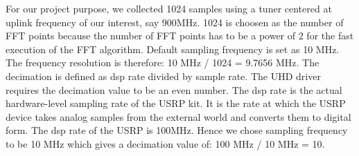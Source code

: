 For our project purpose, we collected 1024 samples using a tuner centered at 
uplink frequency of our interest, say 900MHz. 1024 is choosen as the number of 
FFT points because the number of FFT points has to be a power of 2 for the fast 
execution of the FFT algorithm. Default  sampling frequency is set as 10 MHz. 
The frequency resolution is therefore: 10 MHz / 1024 = 9.7656 MHz. The 
decimation is defined as dsp rate divided by sample rate. The UHD driver 
requires the decimation value to be an even number. The dsp rate is the actual 
hardware-level sampling rate of the USRP kit. It is the rate at which the USRP 
device takes analog samples from the external world and converts them to digital
form. The dsp rate of the USRP is 100MHz. Hence we chose sampling frequency to 
be 10 MHz which gives a decimation value of: 100 MHz / 10 MHz = 10.
